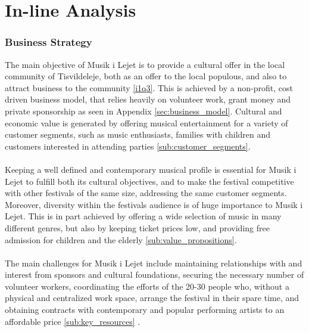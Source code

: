 \part{In-line Analysis}

\section{Business Strategy}
The main objective of Musik i Lejet is to provide a cultural offer in the local community of Tisvildeleje, both as an offer to the local populous, and also to attract business to the community \ref{i1q3}. This is achieved by a non-profit, cost driven business model, that relies heavily on volunteer work, grant money and private sponsorship as seen in Appendix \ref{sec:business_model}. Cultural and economic value is generated by offering musical entertainment for a variety of customer segments, such as music enthusiasts, families with children and customers interested in attending parties \ref{sub:customer_segments}.
\\ \\
Keeping a well defined and contemporary musical profile is essential for Musik i Lejet to fulfill both its cultural objectives, and to make the festival competitive with other festivals of the same size, addressing the same customer segments. Moreover, diversity within the festivals audience is of huge importance to Musik i Lejet. This is in part achieved by offering a wide selection of music in many different genres, but also by keeping ticket prices low, and providing free admission for children and the elderly \ref{sub:value_propositions}.
\\ \\
The main challenges for Musik i Lejet include maintaining relationships with and interest from sponsors and cultural foundations, securing the necessary number of volunteer workers, coordinating the efforts of the 20-30 people who, without a physical and centralized work space, arrange the festival in their spare time, and obtaining contracts with contemporary and popular performing artists to an affordable price \ref{sub:key_resources} .

